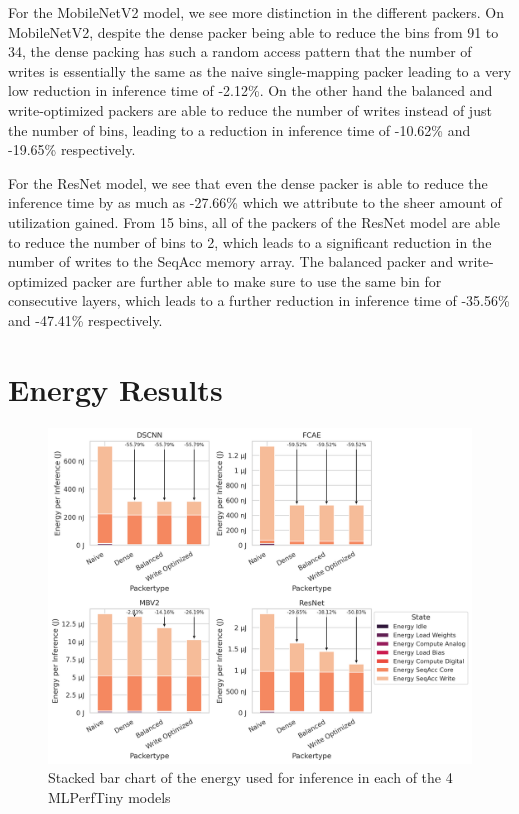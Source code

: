 For the MobileNetV2 model, we see more distinction in the different packers. On MobileNetV2, despite the dense packer being able to reduce the bins from 91 to 34, the dense packing has such a random access pattern that the number of writes is essentially the same as the naive single-mapping packer leading to a very low reduction in inference time of -2.12\%. On the other hand the balanced and write-optimized packers are able to reduce the number of writes instead of just the number of bins, leading to a reduction in inference time of -10.62\% and -19.65\% respectively.

For the ResNet model, we see that even the dense packer is able to reduce the inference time by as much as -27.66\% which we attribute to the sheer amount of utilization gained. From 15 bins, all of the packers of the ResNet model are able to reduce the number of bins to 2, which leads to a significant reduction in the number of writes to the SeqAcc memory array. The balanced packer and write-optimized packer are further able to make sure to use the same bin for consecutive layers, which leads to a further reduction in inference time of -35.56\% and -47.41\% respectively.

\section{Energy Results}

\begin{figure}[htbp]
    \centering
    \includegraphics[width=\textwidth]{images/marp_qracc/energy_bars.png}
    \caption{Stacked bar chart of the energy used for inference in each of the 4 MLPerfTiny models}
    \label{fig:energy_bars}
\end{figure}

